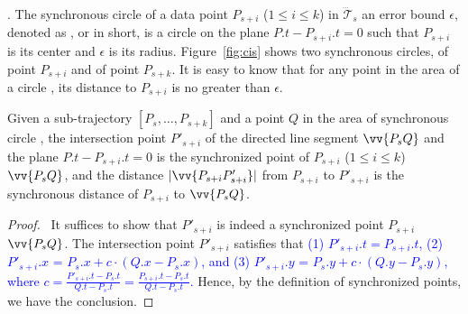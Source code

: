 


. The synchronous circle of a data point $P_{s+i}$ ($1\le i\le k$) in $\dddot{\mathcal{T}}_s$ \wrt an error bound $\epsilon$, denoted as , or  in short, is a circle on the plane $P.t-P_{s+i}.t = 0$ such that $P_{s+i}$ is its center and $\epsilon$ is its radius.
%
Figure~\ref{fig:cis} shows two synchronous circles,  of point $P_{s+i}$ and  of point $P_{s+k}$.
It is easy to know that for any point in the area of a circle , its distance to $P_{s+i}$ is no greater than $\epsilon$.




\begin{prop}
\label{prop-3d-syn-point}
Given a sub-trajectory $[P_s, \ldots, P_{s+k}]$ and a point $Q$ in the area of synchronous circle , the intersection point $P'_{s+i}$ of the directed line segment $\vv{P_sQ}$ and the plane $P.t - P_{s+i}.t = 0$ is the synchronized point of $P_{s+i}$ ($1\le i\le k$) \wrt  $\vv{P_sQ}$, and the distance $|\vv{P_{s+i}P'_{s+i}}|$ from $P_{s+i}$ to $P'_{s+i}$ is the synchronous distance of $P_{s+i}$ to $\vv{P_sQ}$.
\end{prop}

\begin{proof}\ It suffices to show that $P'_{s+i}$ is indeed a synchronized point $P_{s+i}$ \wrt $\vv{P_sQ}$.
%
The intersection point $P'_{s+i}$ satisfies that
\textcolor{blue}{
(1) $P'_{s+i}.t = P_{s+i}.t$,
(2) $P'_{s+i}.x$ = $P_s.x +  c\cdot(Q.x - P_s.x)$, and
(3) $P'_{s+i}.y$ = $P_s.y +  c\cdot(Q.y - P_s.y)$,
where $c= \frac{P'_{s+i}.t - P_{s}.t}{Q.t - P_{s}.t}= \frac{P_{s+i}.t-P_s.t}{Q.t-P_s.t}$.
}%
Hence, by the definition of synchronized points, we have the conclusion. \eop
\end{proof}



